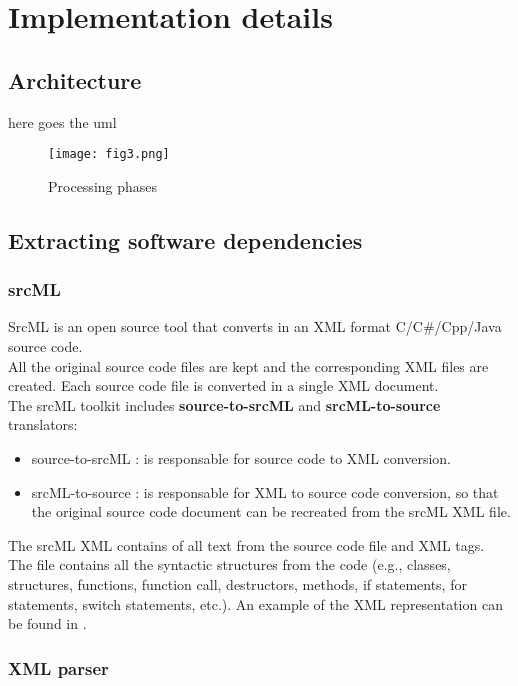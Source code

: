 \chapter{Implementation details}
\section{Architecture}
here goes the uml
\begin{figure*}[h]
\centering
\texttt{[image: fig3.png]}
\caption{Processing phases}
\label{fig:fig3}
\end{figure*}

\section{Extracting software dependencies}
\subsection{srcML}
SrcML is an open source tool that converts in an XML format C/C\#/Cpp/Java source code. \cite{srcml1}\\
All the original source code files are kept and the corresponding XML files are created. Each source code file is converted in a single XML document.\\
 The srcML toolkit includes \textbf{source-to-srcML} and \textbf{srcML-to-source} translators:
\begin{itemize}
  \item source-to-srcML : is responsable for source code to XML conversion.
  \item srcML-to-source : is responsable for XML to source code conversion, so that the original source code document can be recreated from the srcML XML file.
\end{itemize}

The srcML XML contains of all text from the source code file and XML tags. The file contains all the syntactic structures from the code (e.g., classes, structures, functions, function call, destructors, methods, if statements, for statements, switch statements, etc.).\cite{srcml2}
An example of the XML representation can be found in .
\subsection{XML parser}


